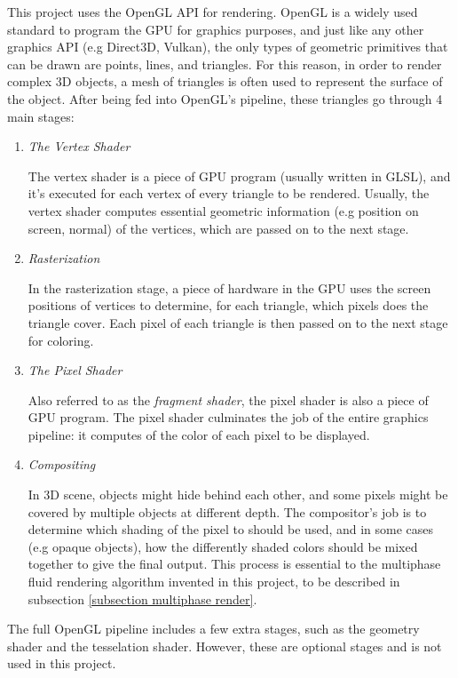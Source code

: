 This project uses the OpenGL API for rendering. OpenGL is a widely used standard to program the GPU for graphics purposes, and just like any other graphics API (e.g Direct3D, Vulkan), the only types of geometric primitives that can be drawn are points, lines, and triangles. For this reason, in order to render complex 3D objects, a mesh of triangles is often used to represent the surface of the object. After being fed into OpenGL's pipeline, these triangles go through 4 main stages:
\begin{enumerate}
    \item 
    \textit{The Vertex Shader}

    The vertex shader is a piece of GPU program (usually written in GLSL), and it's executed for each vertex of every triangle to be rendered. Usually, the vertex shader computes essential geometric information (e.g position on screen, normal) of the vertices, which are passed on to the next stage.
    
    \item 
    \textit{Rasterization}

    In the rasterization stage, a piece of hardware in the GPU uses the screen positions of vertices to determine, for each triangle, which pixels does the triangle cover. Each pixel of each triangle is then passed on to the next stage for coloring.
    
    \item
    \textit{The Pixel Shader}

    Also referred to as the \textit{fragment shader}, the pixel shader is also a piece of GPU program. The pixel shader culminates the job of the entire graphics pipeline: it computes of the color of each pixel to be displayed.

    \item 
    \textit{Compositing}

    In 3D scene, objects might hide behind each other, and some pixels might be covered by multiple objects at different depth. The compositor's job is to determine which shading of the pixel to should be used, and in some cases (e.g opaque objects), how the differently shaded colors should be mixed together to give the final output. This process is essential to the multiphase fluid rendering algorithm invented in this project, to be described in subsection \ref{subsection multiphase render}.
    
\end{enumerate}

The full OpenGL pipeline includes a few extra stages, such as the geometry shader and the tesselation shader. However, these are optional stages and is not used in this project. 


